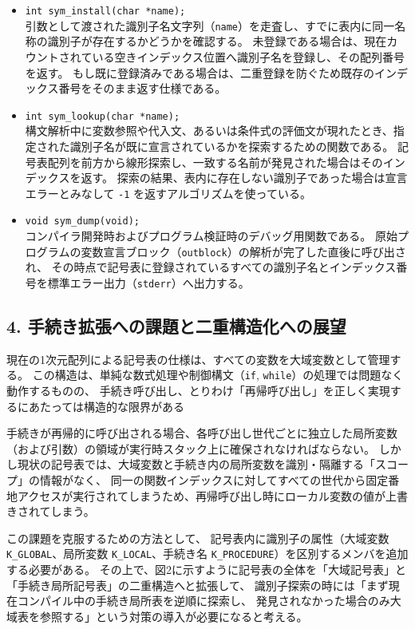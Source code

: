 \documentclass[11pt,a4paper,dvipdfmx]{bxjsarticle}
\begin{document}
\begin{itemize}
    \item \texttt{int sym\_install(char *name); } \\
    引数として渡された識別子名文字列（\texttt{name}）を走査し、すでに表内に同一名称の識別子が存在するかどうかを確認する。
    未登録である場合は、現在カウントされている空きインデックス位置へ識別子名を登録し、その配列番号を返す。
    もし既に登録済みである場合は、二重登録を防ぐため既存のインデックス番号をそのまま返す仕様である。
    \item \texttt{int sym\_lookup(char *name); } \\
    構文解析中に変数参照や代入文、あるいは条件式の評価文が現れたとき、指定された識別子名が既に宣言されているかを探索するための関数である。
    記号表配列を前方から線形探索し、一致する名前が発見された場合はそのインデックスを返す。
    探索の結果、表内に存在しない識別子であった場合は宣言エラーとみなして \texttt{-1} を返すアルゴリズムを使っている。
    \item \texttt{void sym\_dump(void); } \\
    コンパイラ開発時およびプログラム検証時のデバッグ用関数である。
    原始プログラムの変数宣言ブロック（\texttt{outblock}）の解析が完了した直後に呼び出され、
    その時点で記号表に登録されているすべての識別子名とインデックス番号を標準エラー出力（\texttt{stderr}）へ出力する。
\end{itemize}

\subsection*{4. 手続き拡張への課題と二重構造化への展望}
現在の1次元配列による記号表の仕様は、すべての変数を大域変数として管理する。
この構造は、単純な数式処理や制御構文（\texttt{if}, \texttt{while}）の処理では問題なく動作するものの、
手続き呼び出し、とりわけ「再帰呼び出し」を正しく実現するにあたっては構造的な限界がある

手続きが再帰的に呼び出される場合、各呼び出し世代ごとに独立した局所変数（および引数）の領域が実行時スタック上に確保されなければならない。
しかし現状の記号表では、大域変数と手続き内の局所変数を識別・隔離する「スコープ」の情報がなく、
同一の関数インデックスに対してすべての世代から固定番地アクセスが実行されてしまうため、再帰呼び出し時にローカル変数の値が上書きされてしまう。

この課題を克服するための方法として、
記号表内に識別子の属性（大域変数 \texttt{K\_GLOBAL}、局所変数 \texttt{K\_LOCAL}、手続き名 \texttt{K\_PROCEDURE}）を区別するメンバを追加する必要がある。
その上で、図2に示すように記号表の全体を「大域記号表」と「手続き局所記号表」の二重構造へと拡張して、
識別子探索の時には「まず現在コンパイル中の手続き局所表を逆順に探索し、
発見されなかった場合のみ大域表を参照する」という対策の導入が必要になると考える。
\end{document}
